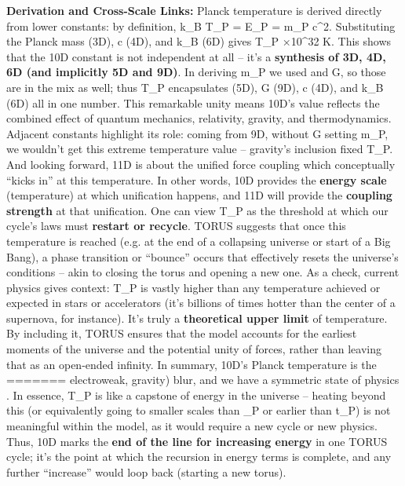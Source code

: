 \documentclass[]{article}
\begin{document}
\textbf{Derivation and Cross-Scale Links:} Planck temperature is derived
directly from lower constants: by definition, k\_B T\_P = E\_P = m\_P
c\^{}2\hspace{0pt}. Substituting the Planck mass (3D), c (4D), and k\_B
(6D) gives T\_P ×10\^{}32 K\hspace{0pt}. This shows that the 10D
constant is not independent at all -- it's a \textbf{synthesis of 3D,
4D, 6D (and implicitly 5D and 9D)}\hspace{0pt}. In deriving m\_P we used
\hbar and G, so those are in the mix as well; thus T\_P encapsulates \hbar (5D),
G (9D), c (4D), and k\_B (6D) all in one number\hspace{0pt}. This
remarkable unity means 10D's value reflects the combined effect of
quantum mechanics, relativity, gravity, and thermodynamics. Adjacent
constants highlight its role: coming from 9D, without G setting m\_P, we
wouldn't get this extreme temperature value -- gravity's inclusion fixed
T\_P. And looking forward, 11D is about the unified force coupling which
conceptually ``kicks in'' at this temperature. In other words, 10D
provides the \textbf{energy scale} (temperature) at which unification
happens, and 11D will provide the \textbf{coupling strength} at that
unification\hspace{0pt}. One can view T\_P as the threshold at which our
cycle's laws must \textbf{restart or recycle}. TORUS suggests that once
this temperature is reached (e.g. at the end of a collapsing universe or
start of a Big Bang), a phase transition or ``bounce'' occurs that
effectively resets the universe's conditions -- akin to closing the
torus and opening a new one\hspace{0pt}. As a check, current physics
gives context: T\_P is vastly higher than any temperature achieved or
expected in stars or accelerators (it's billions of times hotter than
the center of a supernova, for instance). It's truly a
\textbf{theoretical upper limit} of temperature. By including it, TORUS
ensures that the model accounts for the earliest moments of the universe
and the potential unity of forces, rather than leaving that as an
open-ended infinity. In summary, 10D's Planck temperature is the
=======
electroweak, gravity) blur, and we have a symmetric state of physics​.
In essence, T\_P is like a capstone of energy in the universe -- heating
beyond this (or equivalently going to smaller scales than \ell\_P or
earlier than t\_P) is not meaningful within the model, as it would
require a new cycle or new physics. Thus, 10D marks the \textbf{end of
the line for increasing energy} in one TORUS cycle; it's the point at
which the recursion in energy terms is complete, and any further
``increase'' would loop back (starting a new torus).
\end{document}
